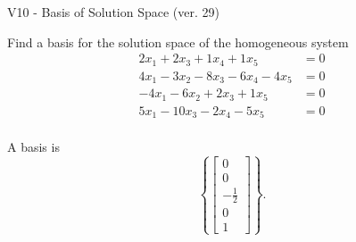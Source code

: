\begin{exercise}
  \begin{exerciseTitle}V10 - Basis of Solution Space (ver. 29)\end{exerciseTitle}
  \begin{exerciseStatement}
    Find a basis for the solution space of the homogeneous system 
\begin{align*}
 2 x_ 1 + 2 x_ 3 + 1 x_ 4 + 1 x_ 5 &= 0  \\ 
  4 x_ 1 -3 x_ 2 -8 x_ 3 -6 x_ 4 -4 x_ 5 &= 0  \\ 
  -4 x_ 1 -6 x_ 2 + 2 x_ 3 + 1 x_ 5 &= 0  \\ 
  5 x_ 1 -10 x_ 3 -2 x_ 4 -5 x_ 5 &= 0  \\ 
 \end{align*}


 
  \end{exerciseStatement}

  \begin{exerciseAnswer}
   A basis is   
\[\left\{\left[\begin{array}{c}
0 \\
0 \\
-\frac{1}{2} \\
0 \\
1
\end{array}\right]\right\}.\]

  


  \end{exerciseAnswer}
\end{exercise}